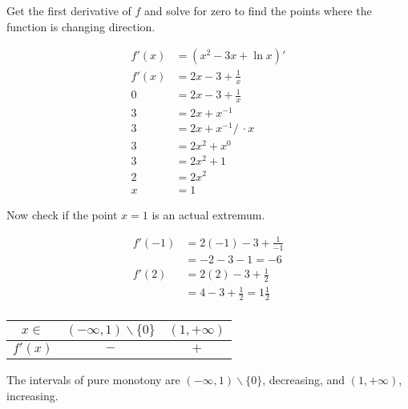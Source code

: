 Get the first derivative of $f$ and solve
for zero to find the points where the 
function is changing direction.  

\begin{align}
    f'(x) &= \left( x^2 - 3x + \ln{x} \right)' \\
    f'(x) &= 2x - 3 + \frac{1}{x} \\
    0 &= 2x - 3 + \frac{1}{x} \\
    3 &= 2x + x^{-1} \\
    3 &= 2x + x^{-1} /\ \cdot x \\
    3 &= 2x^2 + x^0 \\
    3 &= 2x^2 + 1 \\
    2 &= 2x^2 \\
    x &= 1
\end{align}

Now check if the point $x = 1$ is an actual extremum.

\begin{align}
    f'(-1) &= 2(-1) - 3 + \frac{1}{-1} \\
    &= -2 -3 -1 = -6 \\ 
    f'(2) &= 2(2) - 3 + \frac{1}{2} \\
    &= 4 - 3 + \frac{1}{2} = 1\frac{1}{2} \\
\end{align}

\begin{center}
    \begin{tabular}{|c|c|c|}
        \hline
        $x \in$ & $(-\infty, 1) \backslash \{0\}$ & $(1, +\infty)$ \\ \hline
        $f'(x)$ & $-$ & $+$ \\ \hline
    \end{tabular}
\end{center}

The intervals of pure monotony are $(-\infty, 1) \backslash \{0\}$,
decreasing, and $(1, +\infty)$, increasing.